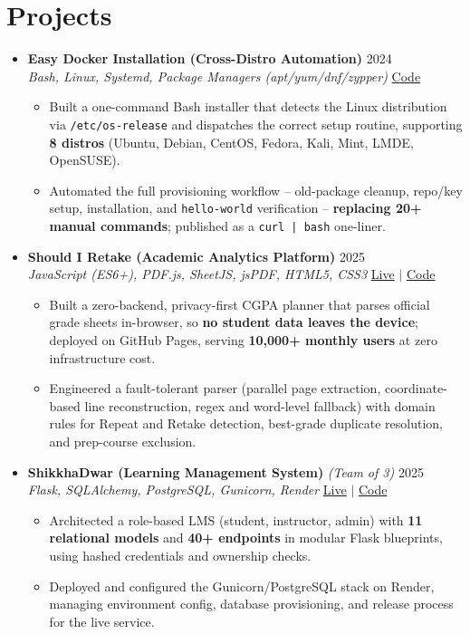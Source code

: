 \documentclass[a4paper]{article}
\newcommand{\resumeItem}[1]{
  \item\small{
    {#1 \vspace{-2pt}}
  }
}
\newcommand{\resumeItemListStart}{\begin{itemize}}
\newcommand{\resumeItemListEnd}{\end{itemize}\vspace{-5pt}}
\begin{document}
\section{Projects}
  \begin{itemize}[leftmargin=0.15in, label={}, itemsep=6pt]

    \item
    \textbf{Easy Docker Installation (Cross-Distro Automation)} \hfill 2024\\
    \small\textit{Bash, Linux, Systemd, Package Managers (apt/yum/dnf/zypper)} \hfill
    \href{https://github.com/badhon495/Easy_Docker_Installation}{Code}
    \vspace{-5pt}
    \resumeItemListStart
      \resumeItem{Built a one-command Bash installer that detects the Linux distribution via \texttt{/etc/os-release} and dispatches the correct setup routine, supporting \textbf{8 distros} (Ubuntu, Debian, CentOS, Fedora, Kali, Mint, LMDE, OpenSUSE).}
      \resumeItem{Automated the full provisioning workflow -- old-package cleanup, repo/key setup, installation, and \texttt{hello-world} verification -- \textbf{replacing 20+ manual commands}; published as a \texttt{curl | bash} one-liner.}
    \resumeItemListEnd

    \item
    \textbf{Should I Retake (Academic Analytics Platform)} \hfill 2025\\
    \small\textit{JavaScript (ES6+), PDF.js, SheetJS, jsPDF, HTML5, CSS3} \hfill
    \href{https://badhon495.github.io/should-i-retake/}{Live} $|$
    \href{https://github.com/badhon495/should-i-retake}{Code}
    \vspace{-5pt}
    \resumeItemListStart
      \resumeItem{Built a zero-backend, privacy-first CGPA planner that parses official grade sheets in-browser, so \textbf{no student data leaves the device}; deployed on GitHub Pages, serving \textbf{10,000+ monthly users} at zero infrastructure cost.}
      \resumeItem{Engineered a fault-tolerant parser (parallel page extraction, coordinate-based line reconstruction, regex and word-level fallback) with domain rules for Repeat and Retake detection, best-grade duplicate resolution, and prep-course exclusion.}
    \resumeItemListEnd

    \item
    \textbf{ShikkhaDwar (Learning Management System)} \textit{\small (Team of 3)} \hfill 2025\\
    \small\textit{Flask, SQLAlchemy, PostgreSQL, Gunicorn, Render} \hfill
    \href{https://shikkhadwar-81r2.onrender.com/}{Live} $|$
    \href{https://github.com/nihal-kabir/ShikkhaDwar}{Code}
    \vspace{-5pt}
    \resumeItemListStart
      \resumeItem{Architected a role-based LMS (student, instructor, admin) with \textbf{11 relational models} and \textbf{40+ endpoints} in modular Flask blueprints, using hashed credentials and ownership checks.}
      \resumeItem{Deployed and configured the Gunicorn/PostgreSQL stack on Render, managing environment config, database provisioning, and release process for the live service.}
    \resumeItemListEnd

  \end{itemize}
\end{document}
